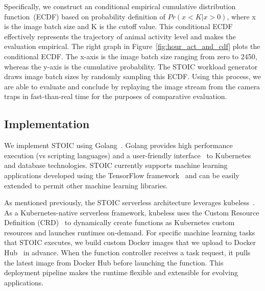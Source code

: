 Specifically, we construct an conditional empirical cumulative distribution function~(ECDF) based on probability definition of  $Pr(x < K | x > 0)$, where x is the image batch size and K is the cutoff value. This conditional ECDF effectively represents the trajectory of animal activity level and makes the evaluation empirical. The right graph in Figure~\ref{fig:hour_act_and_cdf} plots the conditional ECDF. 
The x-axis is the image batch size ranging from zero to 2450, whereas the y-axis is the cumulative probability. The STOIC workload generator draws image batch sizes by
randomly sampling this ECDF.
Using this process, we are able to evaluate and conclude by replaying the image stream from the camera traps in fast-than-real time for the purposes of comparative
evaluation.




 \subsection{Implementation}

We implement STOIC using Golang~\cite{ref:golang}. Golang provides high performance execution (vs scripting languages) and a user-friendly interface~\cite{ref:client-go} to Kubernetes and database technologies. STOIC currently supports machine learning applications developed using the TensorFlow framework~\cite{ref:tensorflow} and can be easily extended to permit other machine learning libraries.
 
As mentioned previously, the STOIC serverless architecture leverages kubeless~\cite{ref:kubeless}. As a Kubernetes-native serverless framework, kubeless uses the Custom Resource Definition (CRD)~\cite{ref:crd} to dynamically create functions as Kubernetes custom resources and launches runtimes on-demand. For specific machine learning tasks that STOIC executes, we build custom Docker images that we upload to Docker Hub~\cite{ref:dockerhub} in advance. When the function controller receives a task request, it pulls the latest image from Docker Hub before launching the function. This deployment pipeline makes the runtime flexible and extensible for evolving applications. 

